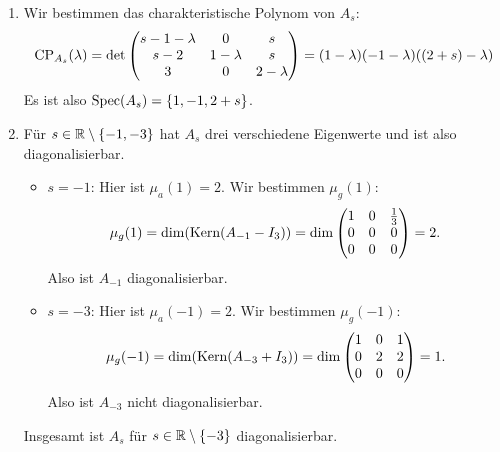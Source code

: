 \begin{enumerate}
	\item Wir bestimmen das charakteristische Polynom von \( A_s \):
	\begin{equation*}
	 	\text{CP}_{A_s}(\lambda) = \det \begin{pmatrix}
	 		s - 1 - \lambda & 0 & s \\
	 		s-2 & 1 - \lambda & s \\
	 		3 & 0 & 2-\lambda
	 	\end{pmatrix} = (1-\lambda)(-1-\lambda)((2+s) - \lambda)
	 \end{equation*} 
	 Es ist also \( \text{Spec}(A_s) = \{ 1, -1, 2+s \} \).

	 \item Für \( s \in \mathbb{R} \setminus \{ -1 , -3 \} \) hat \( A_s \) drei verschiedene Eigenwerte und ist also diagonalisierbar.
	 \begin{itemize}
	 	\item \( s = -1 \): Hier ist \( \mu_a(1) = 2 \). Wir bestimmen \( \mu_g(1) \):
	 	\begin{equation*}
	 	 	\mu_g(1) = \dim(\text{Kern}(A_{-1} - I_3)) = \dim \begin{pmatrix}
	 	 		1 & 0 & \tfrac{1}{3} \\
	 	 		0 & 0 & 0 \\
	 	 		0 & 0 & 0 
	 	 	\end{pmatrix} = 2\text{.}
	 	 \end{equation*} 
	 	 Also ist \( A_{-1} \) diagonalisierbar.

	 	 \item \( s = -3 \): Hier ist \( \mu_a(-1) = 2 \). Wir bestimmen \( \mu_g(-1) \):
	 	 \begin{equation*}
	 	 	\mu_g(-1) = \dim(\text{Kern}(A_{-3} + I_3)) = \dim \begin{pmatrix}
	 	 		1 & 0 & 1 \\
	 	 		0 & 2 & 2 \\
	 	 		0 & 0 & 0 
	 	 	\end{pmatrix} = 1\text{.}
	 	 \end{equation*}
	 	 Also ist \( A_{-3} \) nicht diagonalisierbar.
	 \end{itemize}
	 Insgesamt ist \( A_s \) für \( s \in \mathbb{R} \setminus \{ -3 \} \) diagonalisierbar.


\end{enumerate}
